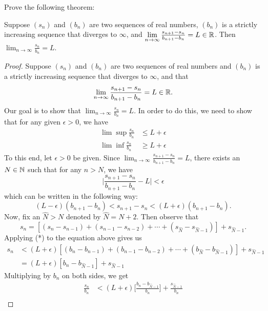 \documentclass[a4paper]{article}
\begin{document}
\begin{problem}
   Prove the following theorem: 
   \begin{center}
       Suppose \( ({s}_{n}) \) and \( ({b}_{n}) \) are two sequences of real numbers, \( ({b}_{n}) \) is a strictly increasing sequence that diverges to \( \infty   \), and \( \lim_{ n \to \infty  }  \frac{ {s}_{n+1} - {s}_{n}  }{ {b}_{n+1} - {b}_{n} } = L \in \R  \). Then \( \lim_{ n \to \infty  }  \frac{ {s}_{n} }{  {b}_{n} }  = L  \).
   \end{center}
\end{problem}
\begin{proof}
Suppose \( ({s}_{n}) \) and \( ({b}_{n}) \) are two sequences of real numbers and \( ({b}_{n}) \) is a strictly increasing sequence that diverges to \( \infty  \), and that 
\[  \lim_{ n \to \infty  }  \frac{ {s}_{n+1} - {s}_{n} }{  {b}_{n+1} - {b}_{n} }  =  L \in \R.  \]
Our goal is to show that \( \lim_{ n \to \infty  }  \frac{ {s}_{n} }{ {b}_{n} }  = L  \). In order to do this, we need to show that for any given \( \epsilon > 0  \), we have
\begin{align*}
    \lim \sup \frac{ {s}_{n} }{ {b}_{n} } &\leq L + \epsilon \tag{1}  \\
    \lim \inf \frac{ {s}_{n} }{ {b}_{n}  }  &\geq L + \epsilon \tag{2}
\end{align*}
To this end, let \( \epsilon > 0  \) be given. Since \( \lim_{ n \to \infty  }  \frac{ {s}_{n+1} - {s}_{n} }{  {b}_{n+1} - {b}_{n} }  = L  \), there exists an \( N \in \mathbb{N}  \) such that for any \( n > N \), we have 
\[  \Big|  \frac{ {s}_{n+1} - {s}_{n} }{  {b}_{n+1} - {b}_{n} } - L  \Big| < \epsilon \]
which can be written in the following way:
\[  (L-\epsilon) ({b}_{n+1} - {b}_{n}) < {s}_{n+1} - {s}_{n} < (L + \epsilon)({b}_{n+1} - {b}_{n}). \tag{*} \]
Now, fix an \( \hat{N} > N    \) denoted by \( \hat{N} = N + 2 \). Then observe that 
\[  {s}_{n} = [({s}_{n} - {s}_{n-1}) + ({s}_{n-1} - {s}_{n-2}) + \cdots + ({s}_{\hat{N}} - {s}_{\hat{N} - 1})] + {s}_{\hat{N} - 1}. \]
Applying (*) to the equation above gives us 
\begin{align*}
    {s}_{n} &< (L+\epsilon)[({b}_{n} - {b}_{n-1}) + ({b}_{n-1} - {b}_{n-2}) + \cdots + ({b}_{\hat{N}} - {b}_{\hat{N} -1})] + {s}_{\hat{N}-1} \\
            &= (L+\epsilon)[{b}_{n} - {b}_{\hat{N} - 1}] + {s}_{\hat{N} - 1}
\end{align*}
Multiplying by \( {b}_{n} \) on both sides, we get
\begin{align*} \frac{ {s}_{n} }{ {b}_{n} }  &< (L+\epsilon) \Big[ \frac{ {b}_{n} - {b}_{\hat{N} - 1} }{ {b}_{n} } \Big]  + \frac{ {s}_{\hat{N} - 1} }{ {b}_{n} } \\ 

\end{align*}
\end{proof}
\end{document}
